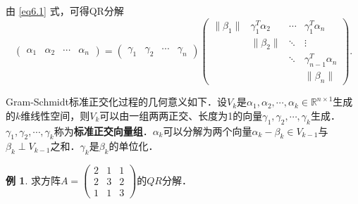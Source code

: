 \documentclass[a4paper,fontset=windows]{ctexbook}
\theoremstyle{definition}
\newtheorem{example}{例}[chapter]
\begin{document}
由 \eqref{eq6.1} 式，可得QR分解
$$\begin{pmatrix}\alpha_1&\alpha_2&\cdots&\alpha_n\end{pmatrix}=\begin{pmatrix}\gamma_1&\gamma_2&\cdots&\gamma_n\end{pmatrix}\begin{pmatrix}\|\beta_1\|&\gamma_1^T\alpha_2&\cdots&\gamma_1^T\alpha_n \\ &\|\beta_2\|&\ddots&\vdots \\ &&\ddots&\gamma_{n-1}^T\alpha_n \\ &&&\|\beta_n\|\end{pmatrix}.$$

Gram-Schmidt标准正交化过程的几何意义如下．设$V_k$是$\alpha_1,\alpha_2,\cdots,\alpha_k\in\mathbb{R}^{n\times 1}$生成的$k$维线性空间，则$V_k$可以由一组两两正交、长度为1的向量$\gamma_1,\gamma_2,\cdots,\gamma_k$生成．$\gamma_1,\gamma_2,\cdots,\gamma_k$称为{\bf 标准正交向量组}．$\alpha_k$可以分解为两个向量$\alpha_k-\beta_k\in V_{k-1}$与$\beta_k\perp V_{k-1}$之和．$\gamma_k$是$\beta_k$的单位化．

\begin{example}
求方阵$A=\begin{pmatrix}2&1&1 \\ 2&3&2 \\ 1&1&3\end{pmatrix}$的$QR$分解．
\end{example}
\end{document}
